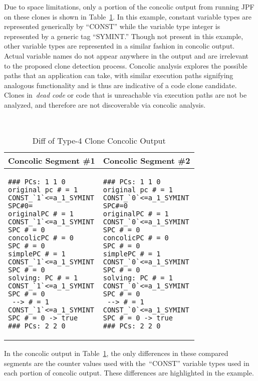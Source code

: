 \documentclass{sig-alternate}
\begin{document}
Due to space limitations, only a portion of the concolic output from running JPF on these clones is shown in Table~\ref{table:concolicoutputcomparision}. In this example, constant variable types are represented generically by ``CONST'' while the variable type integer is represented by a generic tag ``SYMINT.'' Though not present in this example, other variable types are represented in a similar fashion in concolic output. Actual variable names do not appear anywhere in the output and are irrelevant to the proposed clone detection process. Concolic analysis explores the possible paths that an application can take, with similar execution paths signifying analogous functionality and is thus are indicative of a code clone candidate. Clones in~\emph{dead code} or code that is unreachable via execution paths are not be analyzed, and therefore are not discoverable via concolic analysis.


\begin{table}[h] %
\caption{Diff of Type-4 Clone Concolic Output}
~\label{table:concolicoutputcomparision}
\centering
\begin{tabular}{ p{3.8cm} | p{3.8cm} }
\multicolumn{1}{c}{\textbf{Concolic Segment \#1}} & \multicolumn{1}{c}{\textbf{Concolic Segment \#2}} \\ \hline \hline
\begin{lstlisting}[style=ConcolicOutput]
### PCs: 1 1 0
original pc # = 1
CONST_`1`<=a_1_SYMINT
SPC#0=
originalPC # = 1
CONST_`1`<=a_1_SYMINT
SPC # = 0
concolicPC # = 0
SPC # = 0
simplePC # = 1
CONST_`1`<=a_1_SYMINT
SPC # = 0
solving: PC # = 1
CONST_`1`<=a_1_SYMINT
SPC # = 0
 --> # = 1
CONST_`1`<=a_1_SYMINT
SPC # = 0 -> true
### PCs: 2 2 0
\end{lstlisting}
&
\begin{lstlisting}[style=ConcolicOutput]
### PCs: 1 1 0
original pc # = 1
CONST_`0`<=a_1_SYMINT
SPC#=0
originalPC # = 1
CONST_`0`<=a_1_SYMINT
SPC # = 0
concolicPC # = 0
SPC # = 0
simplePC # = 1
CONST_`0`<=a_1_SYMINT
SPC # = 0
solving: PC # = 1
CONST_`0`<=a_1_SYMINT
SPC # = 0
 --> # = 1
CONST_`0`<=a_1_SYMINT
SPC # = 0 -> true
### PCs: 2 2 0
\end{lstlisting}
\end{tabular}
\end{table}


In the concolic output in Table~\ref{table:concolicoutputcomparision}, the only differences in these compared segments are the counter values used with the~``CONST'' variable types used in each portion of concolic output. These differences are highlighted in the example.
\end{document}
